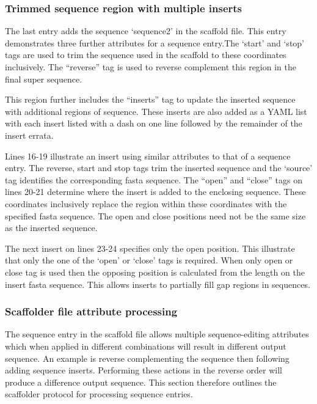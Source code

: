 \documentclass[10pt]{bmc_article}
\newenvironment{bmcformat}{\begin{raggedright}\baselineskip20pt\sloppy\setboolean{publ}{false}}{\end{raggedright}\baselineskip20pt\sloppy}
\begin{document}
\begin{bmcformat}
\subsubsection*{Trimmed sequence region with multiple inserts} %

The last entry adds the sequence `sequence2' in the scaffold file. This entry
demonstrates three further attributes for a sequence entry.The `start' and
`stop' tags are used to trim the sequence used in the scaffold to these
coordinates inclusively. The ``reverse'' tag is used to reverse complement this
region in the final super sequence. \pb

This region further includes the ``inserts'' tag to update the inserted
sequence with additional regions of sequence. These inserts are also added as
a YAML list with each insert listed with a dash on one line followed by the
remainder of the insert errata. \pb

Lines 16-19 illustrate an insert using similar attributes to that of a sequence
entry. The reverse, start and stop tags trim the inserted sequence and the
`source' tag identifies the corresponding fasta sequence. The ``open'' and
``close'' tags on lines 20-21 determine where the insert is added to the
enclosing sequence.  These coordinates inclusively replace the region within
these coordinates with the specified fasta sequence. The open and close
positions need not be the same size as the inserted sequence. \pb

The next insert on lines 23-24 specifies only the open position. This
illustrate that only the one of the `open' or `close' tags is required.  When
only open or close tag is used then the opposing position is calculated from
the length on the insert fasta sequence. This allows inserts to partially fill
gap regions in sequences. \pb

\subsubsection*{Scaffolder file attribute processing} %

The sequence entry in the scaffold file allows multiple sequence-editing
attributes which when applied in different combinations will result in
different output sequence. An example is reverse complementing the sequence
then following adding sequence inserts. Performing these actions in the reverse
order will produce a difference output sequence. This section therefore
outlines the scaffolder protocol for processing sequence entries. \pb


\end{bmcformat}
\end{document}
